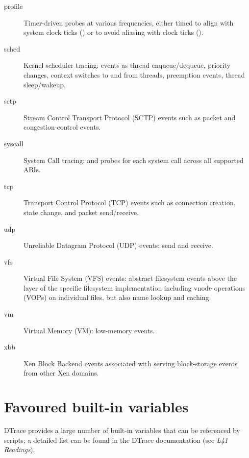 \documentclass[a4paper,10pt]{article}
\begin{document}
\begin{description}
\item[profile] Timer-driven probes at various frequencies, either timed to
  align with system clock ticks () or to avoid aliasing with
  clock ticks ().

\item[sched] Kernel scheduler tracing; events as thread enqueue/dequeue,
  priority changes, context switches to and from threads, preemption events,
  thread sleep/wakeup.

\item[sctp] Stream Control Transport Protocol (SCTP) events such as packet and
  congestion-control events.

\item[syscall] System Call tracing:  and  probes
  for each system call across all supported ABIs.

\item[tcp] Transport Control Protocol (TCP) events such as connection
  creation, state change, and packet send/receive.

\item[udp] Unreliable Datagram Protocol (UDP) events: send and receive.

\item[vfs] Virtual File System (VFS) events: abstract filesystem events above
  the layer of the specific filesystem implementation including vnode
  operations (VOPs) on individual files, but also name lookup and caching.

\item[vm] Virtual Memory (VM): low-memory events.

\item[xbb] Xen Block Backend events associated with serving block-storage
  events from other Xen domains.
\end{description}

\section*{Favoured built-in variables}

DTrace provides a large number of built-in variables that can be referenced by
scripts; a detailed list can be found in the DTrace documentation (see
\textit{L41 Readings}).
\end{document}
